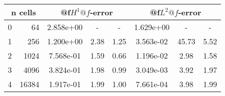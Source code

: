 \documentclass[10pt]{report}
\begin{document}
\begin{table}[H]
\begin{center}
\begin{tabular}{|c|r|c|c|c|c|c|c|} \hline

\multicolumn{2}{|c|}{n cells} & 
\multicolumn{3}{|c|}{@f$H^1@f$-error} & 
\multicolumn{3}{|c|}{@f$L^2@f$-error}\\ \hline
0 & 64 & 2.858e+00 & - & - & 1.629e+00 & - & -\\ \hline
1 & 256 & 1.200e+00 & 2.38 & 1.25 & 3.563e-02 & 45.73 & 5.52\\ \hline
2 & 1024 & 7.568e-01 & 1.59 & 0.66 & 1.196e-02 & 2.98 & 1.58\\ \hline
3 & 4096 & 3.824e-01 & 1.98 & 0.99 & 3.049e-03 & 3.92 & 1.97\\ \hline
4 & 16384 & 1.917e-01 & 1.99 & 1.00 & 7.661e-04 & 3.98 & 1.99\\ \hline
\end{tabular}
\end{center}
\end{table}
\end{document}
